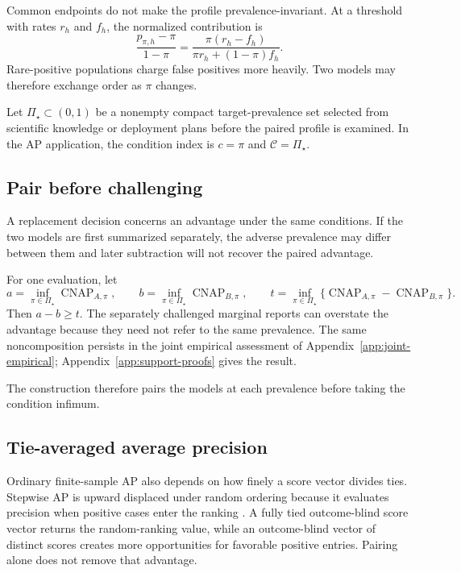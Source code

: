 \documentclass[11pt]{article}
\newcommand{\CNAP}{\operatorname{CNAP}}
\newcommand{\CSet}{\mathcal{C}}
\newcommand{\PSet}{\Pi_\star}
\theoremstyle{remark}
\begin{document}
Common endpoints do not make the profile prevalence-invariant. At a threshold
with rates $r_h$ and $f_h$, the normalized contribution is
\begin{equation}
\frac{p_{\pi,h}-\pi}{1-\pi}
=
\frac{\pi(r_h-f_h)}
{\pi r_h+(1-\pi)f_h}.
\label{eq:threshold-cnap}
\end{equation}
Rare-positive populations charge false positives more heavily. Two models may
therefore exchange order as $\pi$ changes.

Let $\PSet\subset(0,1)$ be a nonempty compact target-prevalence set selected
from scientific knowledge or deployment plans before the paired profile is
examined. In the AP application, the condition index is $c=\pi$ and
$\CSet=\PSet$.

\subsection{Pair before challenging}

A replacement decision concerns an advantage under the same conditions. If
the two models are first summarized separately, the adverse prevalence may
differ between them and later subtraction will not recover the paired
advantage.

For one evaluation, let
\[
a=\inf_{\pi\in\PSet}\CNAP_{A,\pi},
\qquad
b=\inf_{\pi\in\PSet}\CNAP_{B,\pi},
\qquad
t=\inf_{\pi\in\PSet}
\{\CNAP_{A,\pi}-\CNAP_{B,\pi}\}.
\]
Then $a-b\geq t$. The separately challenged marginal reports can overstate the
advantage because they need not refer to the same prevalence. The same noncomposition persists in the joint empirical assessment of
Appendix~\ref{app:joint-empirical}; Appendix~\ref{app:support-proofs} gives
the result.

The construction therefore pairs the models at each prevalence before taking
the condition infimum.

\subsection{Tie-averaged average precision}
\label{sec:tie-average}

Ordinary finite-sample AP also depends on how finely a score vector divides
ties. Stepwise AP is upward displaced under random ordering because it evaluates
precision when positive cases enter the ranking \cite{bestgen2015random}. A
fully tied outcome-blind score vector returns the random-ranking value, while
an outcome-blind vector of distinct scores creates more opportunities for
favorable positive entries. Pairing alone does not remove that advantage.
\end{document}
